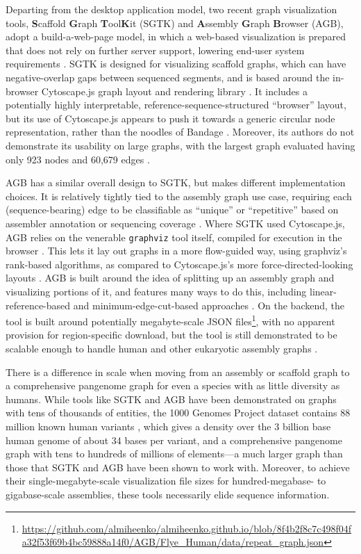 Departing from the desktop application model, two recent graph visualization tools, \textbf{S}caffold \textbf{G}raph \textbf{T}ool\textbf{K}it (SGTK) and \textbf{A}ssembly \textbf{G}raph \textbf{B}rowser (AGB), adopt a build-a-web-page model, in which a web-based visualization is prepared that does not rely on further server support, lowering end-user system requirements \citep{Kunyavskaya_2018,Mikheenko_2019}.
SGTK is designed for visualizing scaffold graphs, which can have negative-overlap gaps between sequenced segments, and is based around the in-browser Cytoscape.js graph layout and rendering library \citep{Kunyavskaya_2018}.
It includes a potentially highly interpretable, reference-sequence-structured ``browser'' layout, but its use of Cytoscape.js appears to push it towards a generic circular node representation, rather than the noodles of Bandage \citep{Kunyavskaya_2018}.
Moreover, its authors do not demonstrate its usability on large graphs, with the largest graph evaluated having only 923 nodes and 60,679 edges \citep{Kunyavskaya_2018}.

AGB has a similar overall design to SGTK, but makes different implementation choices.
It is relatively tightly tied to the assembly graph use case, requiring each (sequence-bearing) edge to be classifiable as ``unique'' or ``repetitive'' based on assembler annotation or sequencing coverage \citep{Mikheenko_2019}.
Where SGTK used Cytoscape.js, AGB relies on the venerable \texttt{graphviz} tool itself, compiled for execution in the browser \citep{Mikheenko_2019, Ellson_2001}.
This lets it lay out graphs in a more flow-guided way, using graphviz's rank-based algorithms, as compared to Cytoscape.js's more force-directed-looking layouts \citep{Mikheenko_2019, Kunyavskaya_2018}.
AGB is built around the idea of splitting up an assembly graph and visualizing portions of it, and features many ways to do this, including linear-reference-based and minimum-edge-cut-based approaches \citep{Mikheenko_2019}.
On the backend, the tool is built around potentially megabyte-scale JSON files\footnote{\url{https://github.com/almiheenko/almiheenko.github.io/blob/8f4b2f8c7c498f04fa32f53f69b4bc59888a14f0/AGB/Flye_Human/data/repeat_graph.json}}, with no apparent provision for region-specific download, but the tool is still demonstrated to be scalable enough to handle human and other eukaryotic assembly graphs \citep{Mikheenko_2019}.

There is a difference in scale when moving from an assembly or scaffold graph to a comprehensive pangenome graph for even a species with as little diversity as humans.
While tools like SGTK and AGB have been demonstrated on graphs with tens of thousands of entities, the 1000 Genomes Project dataset contains 88 million known human variants \citep{1000_2015}, which gives a density over the 3 billion base human genome of about 34 bases per variant, and a comprehensive pangenome graph with tens to hundreds of millions of elements---a much larger graph than those that SGTK and AGB have been shown to work with.
Moreover, to achieve their single-megabyte-scale visualization file sizes for hundred-megabase- to gigabase-scale assemblies, these tools necessarily elide sequence information.

